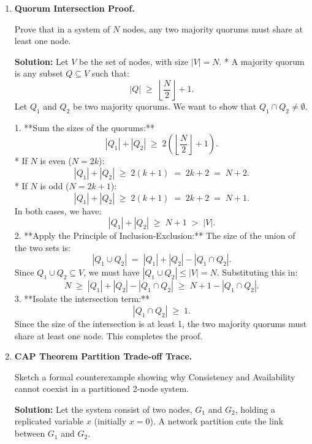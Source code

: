 \documentclass[12pt, a4paper]{book}
\begin{document}
\begin{problembox}
\begin{enumerate}[label=\textbf{E\arabic*.}]
  \item \textbf{Quorum Intersection Proof.}
  
        Prove that in a system of $N$ nodes, any two majority quorums must share at least one node.
        
        \textbf{Solution:}
        Let $V$ be the set of nodes, with size $|V| = N$.
        * A majority quorum is any subset $Q \subseteq V$ such that:
          \[
            |Q| \;\ge\; \left\lfloor \frac{N}{2} \right\rfloor + 1.
          \]
        Let $Q_1$ and $Q_2$ be two majority quorums.
        We want to show that $Q_1 \cap Q_2 \neq \emptyset$.
        
        1. **Sum the sizes of the quorums:**
           \[
             |Q_1| + |Q_2| \;\ge\; 2 \left( \left\lfloor \frac{N}{2} \right\rfloor + 1 \right).
           \]
           * If $N$ is even ($N = 2k$):
             \[
               |Q_1| + |Q_2| \;\ge\; 2(k + 1) \;=\; 2k + 2 \;=\; N + 2.
             \]
           * If $N$ is odd ($N = 2k+1$):
             \[
               |Q_1| + |Q_2| \;\ge\; 2(k + 1) \;=\; 2k + 2 \;=\; N + 1.
             \]
           In both cases, we have:
           \[
             |Q_1| + |Q_2| \;\ge\; N + 1 \;>\; |V|.
           \]
        2. **Apply the Principle of Inclusion-Exclusion:**
           The size of the union of the two sets is:
           \[
             |Q_1 \cup Q_2| \;=\; |Q_1| + |Q_2| - |Q_1 \cap Q_2|.
           \]
           Since $Q_1 \cup Q_2 \subseteq V$, we must have $|Q_1 \cup Q_2| \le |V| = N$.
           Substituting this in:
           \[
             N \;\ge\; |Q_1| + |Q_2| - |Q_1 \cap Q_2| \;\ge\; N + 1 - |Q_1 \cap Q_2|.
           \]
        3. **Isolate the intersection term:**
           \[
             |Q_1 \cap Q_2| \;\ge\; 1.
           \]
        Since the size of the intersection is at least 1, the two majority quorums must share at least one node.
        This completes the proof.
        
  \item \textbf{CAP Theorem Partition Trade-off Trace.}
  
        Sketch a formal counterexample showing why Consistency and Availability cannot coexist in a partitioned 2-node system.
        
        \textbf{Solution:}
        Let the system consist of two nodes, $G_1$ and $G_2$, holding a replicated variable $x$ (initially $x = 0$).
        A network partition cuts the link between $G_1$ and $G_2$.
        

\end{enumerate}
\end{problembox}
\end{document}
